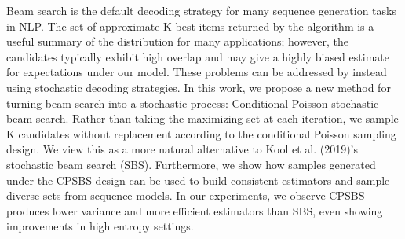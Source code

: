 Beam search is the default decoding strategy for many sequence generation tasks in NLP. The set of approximate K-best items returned by the algorithm is a useful summary of the distribution for many applications; however, the candidates typically exhibit high overlap and may give a highly biased estimate for expectations under our model. These problems can be addressed by instead using stochastic decoding strategies. In this work, we propose a new method for turning beam search into a stochastic process: Conditional Poisson stochastic beam search. Rather than taking the maximizing set at each iteration, we sample K candidates without replacement according to the conditional Poisson sampling design. We view this as a more natural alternative to Kool et al. (2019)'s stochastic beam search (SBS). Furthermore, we show how samples generated under the CPSBS design can be used to build consistent estimators and sample diverse sets from sequence models. In our experiments, we observe CPSBS produces lower variance and more efficient estimators than SBS, even showing improvements in high entropy settings.
